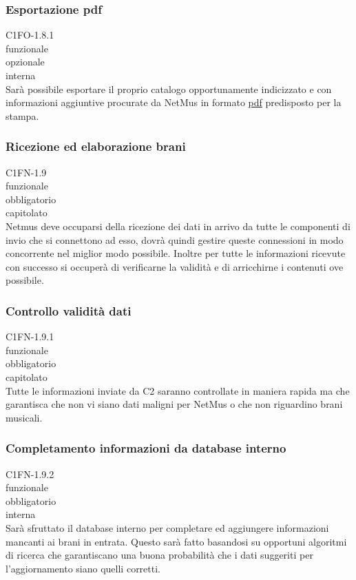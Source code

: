 \subsubsection*{Esportazione pdf}
 C1FO-1.8.1 \\
 funzionale \\
 opzionale \\
 interna \\
Sar\`a possibile esportare il proprio catalogo opportunamente indicizzato e con
informazioni aggiuntive procurate da NetMus in formato \underline{pdf}
predisposto per la stampa.

\subsubsection*{Ricezione ed elaborazione brani}
 C1FN-1.9 \\
 funzionale \\
 obbligatorio \\
 capitolato \\
Netmus deve occuparsi della ricezione dei dati in arrivo da tutte le componenti
di invio che si connettono ad esso, dovr\`a quindi gestire queste connessioni in
modo concorrente nel miglior modo possibile. Inoltre per tutte le informazioni
ricevute con successo si occuper\`a di verificarne la validit\`a e di arricchirne i
contenuti ove possibile.

\subsubsection*{Controllo validit\`a dati}
 C1FN-1.9.1 \\
 funzionale \\
 obbligatorio \\
 capitolato \\
Tutte le informazioni inviate da C2 saranno controllate in maniera
rapida ma che garantisca che non vi siano dati maligni per NetMus o che non
riguardino brani musicali.

\subsubsection*{Completamento informazioni da database interno}
 C1FN-1.9.2 \\
 funzionale \\
 obbligatorio \\
 interna \\
Sar\`a sfruttato il database interno per completare ed aggiungere informazioni
mancanti ai brani in entrata. Questo sar\`a fatto basandosi su opportuni algoritmi
di ricerca che garantiscano una buona probabilit\`a che i dati suggeriti per
l'aggiornamento siano quelli corretti.

